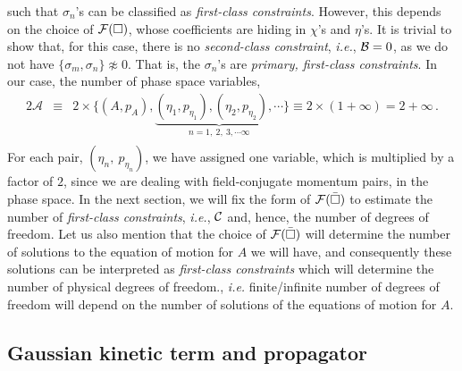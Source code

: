 \documentclass[a4paper,12pt]{article}
\newcommand{\bbox}{\bar{\Box}}
\newcommand{\sa}{\sigma}
\newcommand{\cF}{{\cal F}}
\newcommand{\+}{^{\dagger}}
\newcommand{\2}{\frac{1}{2}}
\newcommand{\3}{\frac{1}{3}}
\newcommand{\4}{\frac{1}{4}}
\newcommand{\6}{\frac{1}{6}}
\newcommand{\8}{\frac{1}{8}}
\begin{document}
such that $\sa_{n}$'s can be classified as {\it first-class constraints}. However, this depends on the choice of ${\cal F}(\Box)$, whose coefficients are hiding in $\chi$'s and $\eta$'s.
It is trivial to show that, for this case, there is no {\it second-class constraint}, \textit{i.e.}, ${\cal B}=0$, as we do not have $\{\sigma _{m},\sigma _{n}\}\not\approx0$. That is, the $\sa_n$'s are \textit{primary, first-class constraints}.  
In our case, the number of  phase space variables, 
\begin{eqnarray}\label{phasespacevariables2}
2\mathcal{A}&\equiv&2\times\bigg\{(A,p_A),\underbrace{(\eta_1,p_{\eta_1}),(\eta_2,p_{\eta_2}),\cdots}_{n=1,~2,~3,\cdots \infty}\bigg\}\equiv2\times(1+\infty)=2+\infty\,. \nonumber \\
\end{eqnarray} 
For each pair,  $(\eta_n,~p_{\eta_n})$, 
we have assigned one variable, which is multiplied by a factor of $2$, since we
are dealing with field-conjugate momentum pairs, in the phase space. In the next section, we will fix the form of ${\cal F}(\bar\Box)$
to estimate the number of {\it first-class constraints}, \textit{i.e.}, ${\cal C}$ and, hence, the number of degrees of freedom. Let us also mention that the choice of $\cF(\bbox)$ will determine the number of solutions to the equation of motion for $A$ we will have, and consequently these solutions can be interpreted as {\it first-class constraints} which will determine the number of physical degrees of freedom., \textit{i.e.}  finite/infinite number of degrees of freedom will depend on the number of solutions of the equations of motion for $A$. 


 


\subsection{Gaussian kinetic term and propagator}
\end{document}
